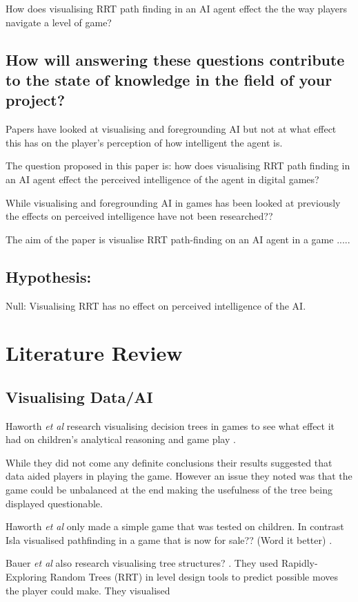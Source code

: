 \documentclass[journal]{IEEEtran}
\begin{document}
How does visualising RRT path finding in an AI agent effect the the way players navigate a level of game?

\subsection{How will answering these questions contribute to the state of knowledge in the field of your project?}
Papers have looked at visualising and foregrounding AI but not at what effect this has on the player's perception of how intelligent the agent is.

The question proposed in this paper is: how does visualising RRT path finding in an AI agent effect the perceived intelligence of the agent in digital games?  

While visualising and foregrounding AI in games has been looked at previously \cite{} the effects on perceived intelligence have not been researched??

The aim of the paper is visualise RRT path-finding on an AI agent in a game .....


\subsection{Hypothesis:}
Null: Visualising RRT has no effect on perceived intelligence of the AI.


\section{Literature Review}
\subsection{Visualising Data/AI}

Haworth \textit{et al} research visualising decision trees in games to see what effect it had on children's analytical reasoning and game play \cite{Haworth2010}. 

While they did not come any definite conclusions their results suggested that data aided players in playing the game. However an issue they noted was that the game could be unbalanced at the end making the usefulness of the tree being displayed questionable.  

Haworth \textit{et al} only made a simple game that was tested on children. In contrast Isla visualised pathfinding in a game that is now for sale?? (Word it better) \cite{Isla2014}.
 
Bauer \textit{et al} also research visualising tree structures? \cite{bauer2012}. They used Rapidly-Exploring Random Trees (RRT) in level design tools to predict possible moves the player could make. They visualised  
 
\end{document}
